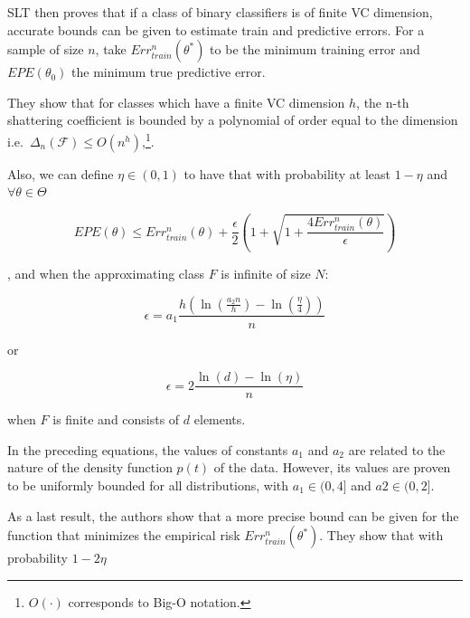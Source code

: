 SLT then proves that if a class of binary classifiers is of finite VC dimension, accurate bounds can be given to estimate train and predictive errors. For a sample of size $n$, take $Err^n_{train}(\theta^*)$ to be the minimum training error and $EPE(\theta_0)$ the minimum true predictive error.


They show that for classes which have a finite VC dimension $h$, the n-th shattering coefficient is bounded by a polynomial of order equal to the dimension
i.e.\ $\Delta_n(\mathcal {F}) \leq O(n^{h})$,\footnote{$O(\cdot)$ corresponds to Big-O notation.}.



Also, we can define $\eta \in (0,1)$ to have that with probability at least $1 - \eta$ and $\forall \theta \in \Theta$

\begin{equation}
EPE(\theta) \leq Err^n_{train}(\theta) + \frac{\epsilon}{2} \left(1 + \sqrt{1 + \frac{4 Err^n_{train}(\theta) }{\epsilon}} \right)
\end{equation}\label{eq:vapnik-classificationBound}

, and when the approximating class $F$ is infinite of size $N$:

\begin{equation}
\epsilon = a_1 \frac{h \left( \ln(\frac{a_2 n}{h} ) - \ln(\frac{\eta}{4} ) \right)}{n}
\end{equation}\label{eq:vapnik-epsilonBound}

or

\begin{equation}
\epsilon = 2 \frac{ \ln(d) - \ln(\eta)}{n}
\end{equation}\label{eq:vapnik-epsilonBoundSimple}

when $F$ is finite and consists of $d$ elements.

In the preceding equations, the values of constants $a_1$ and $a_2$ are related to the nature of the density function $p(t)$ of the data. However, its values are proven to be uniformly bounded for all distributions, with $a_1 \in {(0,4 ]}$ and $a2 \in {(0,2 ]}$.

As a last result, the authors show that a more precise bound can be given for the function that minimizes the empirical risk $Err^n_{train}(\theta^*)$. They show that with probability $1 - 2\eta$

